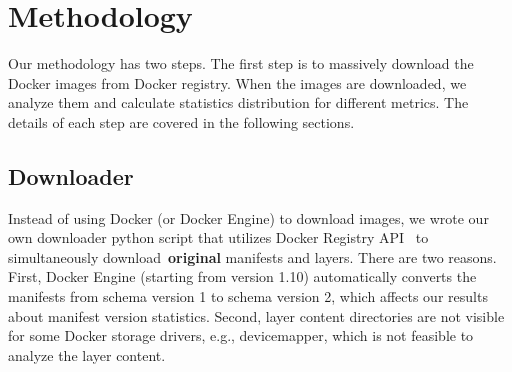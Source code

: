 
\section{Methodology}

Our methodology has two steps.
%
The first step is to massively download the Docker images from Docker registry.
%
When the images are downloaded, we analyze them and calculate statistics distribution for different metrics.
%
The details of each step are covered in the following sections.
%
%




\subsection{Downloader}

Instead of using Docker (or Docker Engine) to download images, we wrote our own downloader python script that utilizes Docker Registry API~\cite{} to simultaneously download~\textbf{original} manifests and layers.
%
%
%
There are two reasons.
%
First, Docker Engine (starting from version 1.10) automatically converts the manifests from schema version 1 to schema version 2, which affects our results about manifest version statistics.
%
Second, layer content directories are not visible for some Docker storage drivers, e.g., devicemapper, which is not feasible to analyze the layer content. 
%




